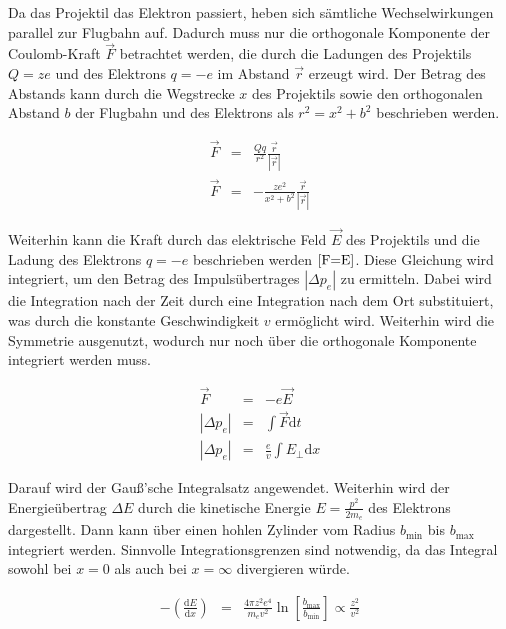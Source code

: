 \documentclass[12pt,a4paper]{scrartcl}
\numberwithin{equation}{section} %
\renewcommand{\[}{} %
\renewcommand{\]}{\noindent} %
\begin{document}
Da das Projektil das Elektron passiert, heben sich sämtliche
Wechselwirkungen parallel zur Flugbahn auf. Dadurch muss nur die
orthogonale Komponente der Coulomb-Kraft \(\vec F\) betrachtet werden,
die durch die Ladungen des Projektils \(Q=ze\) und des Elektrons
\(q=-e\) im Abstand \(\vec r\) erzeugt wird. Der Betrag des Abstands
kann durch die Wegstrecke \(x\) des Projektils sowie den orthogonalen
Abstand \(b\) der Flugbahn und des Elektrons als \(r^2=x^2+b^2\)
beschrieben werden.

\[
\begin{eqnarray}
    \vec F &=& \frac{Qq}{r^2} \frac{\vec{r}}{\left|\vec r\right|} \\
    \vec F &=& -\frac{ze^2}{x^2+b^2} \frac{\vec{r}}{\left|\vec r\right|}
\end{eqnarray}
\]

Weiterhin kann die Kraft durch das elektrische Feld \(\vec E\) des
Projektils und die Ladung des Elektrons \(q=-e\) beschrieben werden
\(\eqref{F=E}\). Diese Gleichung wird integriert, um den Betrag des
Impulsübertrages \(\left|\Delta p_e\right|\) zu ermitteln. Dabei wird
die Integration nach der Zeit durch eine Integration nach dem Ort
substituiert, was durch die konstante Geschwindigkeit \(v\) ermöglicht
wird. Weiterhin wird die Symmetrie ausgenutzt, wodurch nur noch über die
orthogonale Komponente integriert werden muss.

\[
\begin{eqnarray}
    \vec F &=& -e \vec E \label{F=E} \\
    \left|\Delta p_e\right| &=& \int \vec F \mathrm dt \\
    \left|\Delta p_e\right| &=& \frac{e}{v} \int E_\perp \mathrm dx
\end{eqnarray}
\]

Darauf wird der Gauß'sche Integralsatz angewendet. Weiterhin wird der
Energieübertrag \(\Delta E\) durch die kinetische Energie
\(E=\frac{p^2}{2m_e}\) des Elektrons dargestellt. Dann kann über einen
hohlen Zylinder vom Radius \(b_\mathrm{min}\) bis \(b_\mathrm{max}\)
integriert werden. Sinnvolle Integrationsgrenzen sind notwendig, da das
Integral sowohl bei \(x=0\) als auch bei \(x=\infty\) divergieren würde.

\[
\begin{eqnarray}
    -\left(\frac{\mathrm dE}{\mathrm dx}\right)
        &=& \frac{4\pi z^2 e^4}{m_ev^2}
            \ln\left[\frac{b_\mathrm{max}}{b_\mathrm{min}}\right]
            \propto \frac{z^2}{v^2}
\end{eqnarray}
\]
\end{document}

